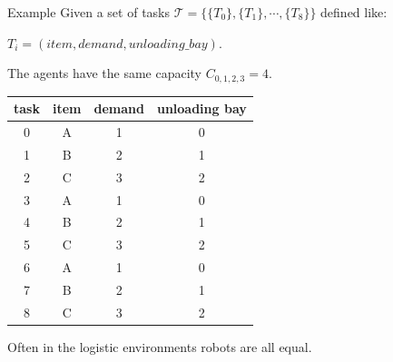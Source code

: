     \begin{frame}[fragile]{Example}
        Given a set of tasks $\mathcal{T}= \{  \{T_0\}, \{T_1\}, \cdots, \{T_8\} \}$ defined like:

        ${T_i=(item, demand, unloading\_bay)}$.
        
        The agents have the same capacity $C_{0,1,2,3} = 4$.
                    \begin{center}
                      \begin{tabular}{|c|c|c|c|} \hline
                        \textbf{task} & \textbf{item} & \textbf{demand} & \textbf{unloading bay} \\ \hline
                        0    & A    & 1      & 0             \\
                        1    & B    & 2      & 1             \\
                        2    & C    & 3      & 2             \\
                        3    & A    & 1      & 0             \\
                        4    & B    & 2      & 1             \\
                        5    & C    & 3      & 2             \\
                        6    & A    & 1      & 0             \\
                        7    & B    & 2      & 1             \\
                        8    & C    & 3      & 2             \\ \hline       
                      \end{tabular} 
                    \end{center}
                    Often in the logistic environments robots are all equal. 
            
    \end{frame}

